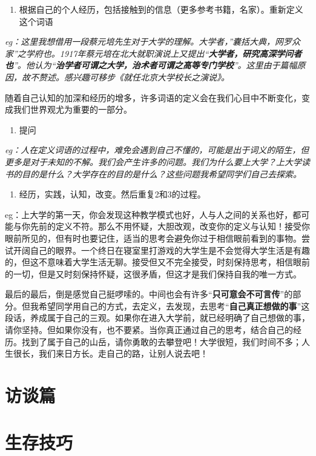 \documentclass{beamer}	%
\theoremstyle{plain}
\theoremstyle{definition}
\theoremstyle{remark}
\numberwithin{equation}{section}
\begin{document}
\begin{frame}
	\begin{enumerate}[2]
		\item 根据自己的个人经历，包括接触到的信息（更多参考书籍，名家）。重新定义这个词语
	\end{enumerate}
	\vspace{1cm}

	\textit{eg：这里我想借用一段蔡元培先生对于大学的理解。大学者，”囊括大典，网罗众家”之学府也。1917年蔡元培在北大就职演说上又提出“\textbf{大学者，研究高深学问者也}”。他认为“\textbf{治学者可谓之大学，治术者可谓之高等专门学校}”。这里由于篇幅原因，故不赘述。感兴趣可移步《就任北京大学校长之演说》。}
	\vspace{0.5cm}

	随着自己认知的加深和经历的增多，许多词语的定义会在我们心目中不断变化，变成我们世界观尤为重要的一部分。
\end{frame}


\begin{frame}
	\begin{enumerate}[3]
		\item 提问
	\end{enumerate}
	\vspace{1cm}

	\textit{eg：人在定义词语的过程中，难免会遇到自己不懂的，可能是出于词义的陌生，但更多是对于未知的不解。我们会产生许多的问题。我们为什么要上大学？上大学读书的目的是什么？大学存在的目的是什么？这些问题我希望同学们自己去探索。}

\end{frame}

\begin{frame}
	\begin{enumerate}[4]
		\item 经历，实践，认知，改变。然后重复2和3的过程。
	\end{enumerate}
	\vspace{1cm}

	eg：上大学的第一天，你会发现这种教学模式也好，人与人之间的关系也好，都可能与你先前的定义不符。那么不用怀疑，大胆改观，改变你的定义与认知！接受你眼前所见的，但有时也要记住，适当的思考会避免你过于相信眼前看到的事物。尝试开阔自己的眼界。一个终日在寝室里打游戏的大学生是不会觉得大学生活是有趣的，但这不意味着大学生活无聊。接受但又不完全接受，时刻保持思考，相信眼前的一切，但是又时刻保持怀疑，这很矛盾，但这才是我们保持自我的唯一方式。
\end{frame}


\begin{frame}
	最后的最后，倒是感觉自己挺啰嗦的。中间也会有许多“\textbf{只可意会不可言传}”的部分。但我希望同学用自己的方式，去定义，去发现，去思考“\textbf{自己真正想做的事}”这段话，养成属于自己的三观。如果你在进入大学前，就已经明确了自己想做的事，请你坚持。但如果你没有，也不要紧。当你真正通过自己的思考，结合自己的经历。找到了属于自己的山岳，请你勇敢的去攀登吧！大学很短，我们时间不多；人生很长，我们来日方长。走自己的路，让别人说去吧！
\end{frame}

\section{访谈篇}




\section{生存技巧}
\end{document}
